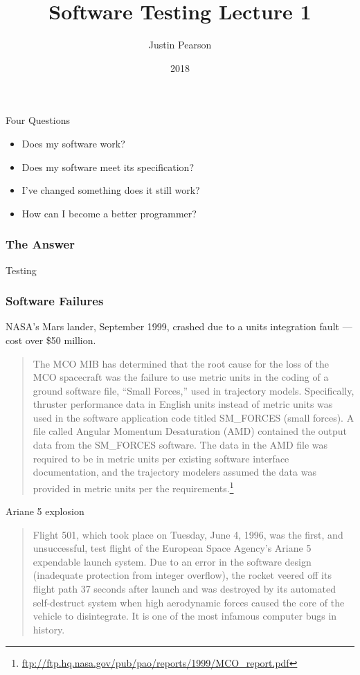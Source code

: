 \documentclass{beamer}
\title{Software Testing  Lecture 1}
\author{Justin Pearson}
\date{2018}
\begin{document}
\lstset{language=python}

\begin{frame}
  \maketitle
\end{frame}
\begin{frame}{Four Questions}
  \begin{itemize}
  \item Does my software work? \pause
  \item Does my software meet its specification? \pause
  \item I've changed something does it still work? \pause
  \item How can I become a better programmer? 
  \end{itemize}
\end{frame}
\begin{frame}
  \frametitle{The Answer}
  \begin{center}
    {\Huge 
  Testing}
  \end{center}
\end{frame}
\begin{frame}
  \frametitle{Software Failures}

NASA's Mars lander, September 1999, crashed due to a units
    integration fault --- cost over  \$50 million.
    \begin{quote}
      The MCO MIB has determined that the root cause for the loss of
      the MCO spacecraft was the failure to use metric units in the
      coding of a ground software file, “Small Forces,” used in
      trajectory models. Specifically, thruster performance data in
      English units instead of metric units was used in the software
      application code titled SM\_FORCES (small forces). A file called
      Angular Momentum Desaturation (AMD) contained the output data
      from the SM\_FORCES software. The data in the AMD file was
      required to be in metric units per existing software interface
      documentation, and the trajectory modelers assumed the data was
      provided in metric units per the requirements.\footnote{\url{ftp://ftp.hq.nasa.gov/pub/pao/reports/1999/MCO_report.pdf}}
    \end{quote}  
\end{frame}
\begin{frame}{Ariane 5 explosion}
  \begin{quote}
    Flight 501, which took place on Tuesday, June 4, 1996, was the
    first, and unsuccessful, test flight of the European Space
    Agency's Ariane 5 expendable launch system. Due to an error in the
    software design (inadequate protection from integer overflow), the
    rocket veered off its flight path 37 seconds after launch and was
    destroyed by its automated self-destruct system when high
    aerodynamic forces caused the core of the vehicle to
    disintegrate. It is one of the most infamous computer bugs in
    history.
  \end{quote}
\end{frame}
\end{document}

